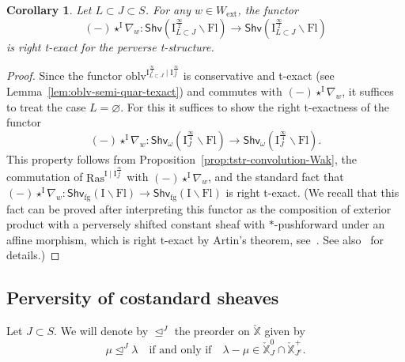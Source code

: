 \documentclass[11pt]{amsart}
\numberwithin{equation}{section}
\theoremstyle{plain}
\newtheorem{corollary}[thm]{Corollary}
\theoremstyle{definition}
\newcommand{\I}{{\mathrm I}}
\newcommand{\X}{{\mathbb X}}
\newcommand{\Xd}{\check{\X}}
\newcommand{\semi}{{{\frac{\infty}{2}}}}
\newcommand{\quar}{{{\frac{\infty}{4}}}}
\newcommand{\oblv}{\mathrm{oblv}}
\newcommand{\ex}{\mathrm{ext}}
\newcommand{\Shv}{\mathsf{Shv}}
\newcommand{\Shvfg}{\mathsf{Shv}_{\mathrm{fg}}}
\newcommand{\Ras}{\mathrm{Ras}}
\newcommand{\Fl}{\mathrm{Fl}}
\newcommand{\comp}{\mathrm{c}}
\begin{document}
\begin{corollary}
\label{cor:right-t-exactness-convolution-nabla}
Let $L \subset J \subset S$.
For any $w \in W_\ex$, the functor 
\[
(-) \star^\I \nabla_w : \Shv\left(\I^{\semi}_{L \subset J} \backslash \Fl\right) \to \Shv\left(\I^{\semi}_{L \subset J}\backslash \Fl\right)
\]
is right t-exact for the perverse t-structure.
\end{corollary}

\begin{proof}
Since the functor $\oblv^{\I^{\semi}_{L \subset J} \mid \I^{\quar}_J}$ is conservative and t-exact (see Lemma~\ref{lem:oblv-semi-quar-texact}) and commutes with $(-) \star^\I \nabla_w$, it suffices to treat the case $L=\varnothing$. For this it suffices to show the right t-exactness of the functor
\[
(-) \star^\I \nabla_w : \Shv_\omega\left(\I^{\quar}_J\backslash \Fl\right) \to \Shv_\omega\left(\I^{\quar}_J\backslash \Fl\right).
\]
This property follows from Proposition~\ref{prop:tstr-convolution-Wak}, the commutation of $\Ras^{\I\mid \I_J^{\quar}}$ with $(-) \star^\I \nabla_w$, and the standard fact that $(-) \star^\I \nabla_w : \Shvfg(\I\backslash \Fl) \to \Shvfg(\I\backslash \Fl)$ is right t-exact. (We recall that this fact can be proved after interpreting this functor as the composition of exterior product with a perversely shifted constant sheaf with $*$-pushforward under an affine morphism, which is right t-exact by Artin's theorem, see~\cite[Th\'eor\`eme~4.1.1]{bbdg}. See also~\cite[\S 4.1.3]{ARbook} for details.)
\end{proof}

\subsection{Perversity of costandard sheaves}
\label{ss:perv-costandards}

Let $J\subset S$. We will denote by $\unlhd^J$ the preorder on $\Xd$ given by 
\[
\mu \unlhd^J \lambda \quad 
\text{if and only if} \quad 
\lambda-\mu \in \Xd_J^0\cap \Xd_{J^{\comp}}^+. 
\]
\end{document}
